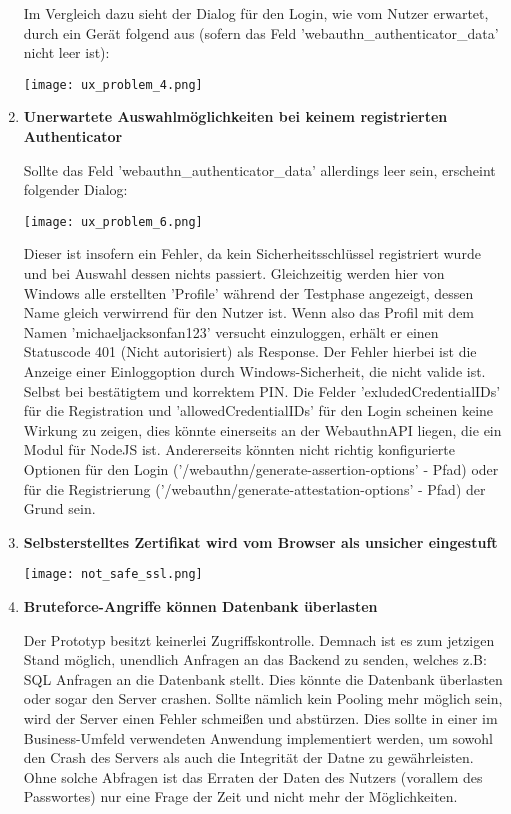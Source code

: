 \begin{enumerate}
Im Vergleich dazu sieht der Dialog für den Login, wie vom Nutzer erwartet, durch ein Gerät folgend aus (sofern das Feld 'webauthn\_authenticator\_data' nicht leer ist):

\begin{center}
    \center
    \texttt{[image: ux\_problem\_4.png]}
\end{center}

\item \textbf{Unerwartete Auswahlmöglichkeiten bei keinem registrierten Authenticator}

Sollte das Feld 'webauthn\_authenticator\_data' allerdings leer sein, erscheint folgender Dialog:

\begin{center}
    \center
    \texttt{[image: ux\_problem\_6.png]}
\end{center}

Dieser ist insofern ein Fehler, da kein Sicherheitsschlüssel registriert wurde und bei Auswahl dessen nichts passiert. Gleichzeitig werden hier von Windows alle erstellten 'Profile' während der Testphase angezeigt, dessen Name gleich verwirrend für den Nutzer ist. Wenn also das Profil mit dem Namen 'michaeljacksonfan123' versucht einzuloggen, erhält er einen Statuscode 401 (Nicht autorisiert) als Response. Der Fehler hierbei ist die Anzeige einer Einloggoption durch Windows-Sicherheit, die nicht valide ist. Selbst bei bestätigtem und korrektem PIN. Die Felder 'exludedCredentialIDs' für die Registration und 'allowedCredentialIDs' für den Login scheinen keine Wirkung zu zeigen, dies könnte einerseits an der WebauthnAPI liegen, die ein Modul für NodeJS ist. Andererseits könnten nicht richtig konfigurierte Optionen für den Login ('/webauthn/generate-assertion-options' - Pfad) oder für die Registrierung ('/webauthn/generate-attestation-options' - Pfad) der Grund sein.

\item \textbf{Selbsterstelltes Zertifikat wird vom Browser als unsicher eingestuft}

\begin{center}
    \center
    \texttt{[image: not\_safe\_ssl.png]}
\end{center}

\item \textbf{Bruteforce-Angriffe können Datenbank überlasten}

Der Prototyp besitzt keinerlei Zugriffskontrolle. Demnach ist es zum jetzigen Stand möglich, unendlich Anfragen an das Backend zu senden, welches z.B: SQL Anfragen an die Datenbank stellt. Dies könnte die Datenbank überlasten oder sogar den Server crashen. Sollte nämlich kein Pooling mehr möglich sein, wird der Server einen Fehler schmeißen und abstürzen. Dies sollte in einer im Business-Umfeld verwendeten Anwendung implementiert werden, um sowohl den Crash des Servers als auch die Integrität der Datne zu gewährleisten. Ohne solche Abfragen ist das Erraten der Daten des Nutzers (vorallem des Passwortes) nur eine Frage der Zeit und nicht mehr der Möglichkeiten.

\end{enumerate}
